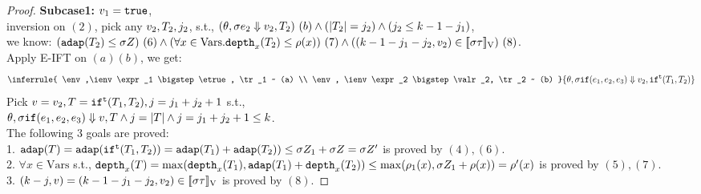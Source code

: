 \documentclass[a4paper,11pt]{article}
\theoremstyle{definition}
\begin{document}
\begin{proof}
{\bf Subcase1:} $v_1 = \mathtt{true}$, \\
%
inversion on $(2)$, pick any $v_2, T_2, j_2$, s.t., $ (\theta, \sigma e_2 \mathrel{\Downarrow} v_2, T_2) ~ (b) \land (|T_2| = j_2) \land (j_2 \leq k-1-j_1)$,\\
%
we know: $(\mathtt{adap}(T_2) \leq \sigma Z)~(6) \land (\forall x \in \mbox{Vars}. \mathtt{depth}_{x}(T_2) \leq \rho(x))~(7) \land ((k-1 - j_1-j_2, v_2) \in [\![ \sigma \tau ]\!]_{\text{V}})~(8)$.\\
%
Apply E-IFT on $(a) (b)$, we get:
\[
  \inferrule{
    \env,\ienv  \expr_1 \bigstep \etrue, \tr_1 ~ (a) \\
    \env, \ienv \expr_2 \bigstep \valr_2, \tr_2 ~ (b)
  }{
    \env, \ienv \eif(\expr_1, \expr_2, \expr_3) \bigstep \valr_2, \trift(\tr_1, \tr_2)
  }
\]
Pick $v = v_2, T = \mathtt{if}^{\mathtt{t}}(T_1, T_2), j =j_1+ j_2+1$ s.t.,\\
%
$\theta, \sigma \mathtt{if}(e_1, e_2, e_3) \mathrel{\Downarrow} v, T \land j =
|T| \land j = j_1 + j_2+1 \leq k$.\\
The following 3 goals are proved:\\
%
1. $\mathtt{adap}(T) = \mathtt{adap}(\mathtt{if}^{\mathtt{t}}(T_1, T_2)) = \mathtt{adap}(T_1) +
\mathtt{adap}(T_2)) \leq \sigma Z_1 + \sigma Z = \sigma Z'$ is proved by $(4),(6)$.\\
%
2. $\forall x \in \mbox{Vars}$ s.t., $ \mathtt{depth}_{x}(T) = \max(\mathtt{depth}_{x}(T_1), \mathtt{adap}(T_1) +
\mathtt{depth}_{x}(T_2)) \leq \max(\rho_1(x), \sigma Z_1 + \rho(x)) =
\rho'(x)  $ is proved by $(5), (7)$.\\
%
3. $(k - j, v) = (k-1 -j_1- j_2, v_2) \in
[\![ \sigma \tau ]\!]_{\text{V}}$ is proved by $(8)$.


\end{proof}
\end{document}
